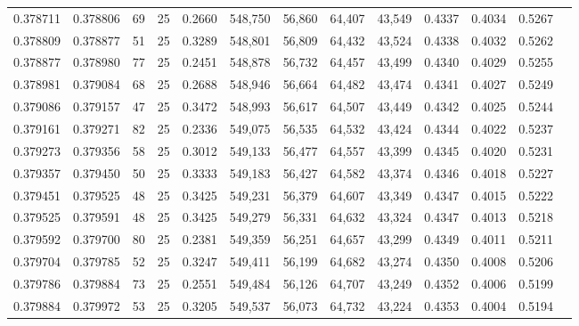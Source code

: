 \begin{tabular}{rrrrrrrrrrrrr}
0.378711 & 0.378806 &    69 &  25 &                                     0.2660 & 548,750 &  56,860 &  64,407 &  43,549 & 0.4337 & 0.4034 & 0.5267 \\
0.378809 & 0.378877 &    51 &  25 &                                     0.3289 & 548,801 &  56,809 &  64,432 &  43,524 & 0.4338 & 0.4032 & 0.5262 \\
0.378877 & 0.378980 &    77 &  25 &                                     0.2451 & 548,878 &  56,732 &  64,457 &  43,499 & 0.4340 & 0.4029 & 0.5255 \\
0.378981 & 0.379084 &    68 &  25 &                                     0.2688 & 548,946 &  56,664 &  64,482 &  43,474 & 0.4341 & 0.4027 & 0.5249 \\
0.379086 & 0.379157 &    47 &  25 &                                     0.3472 & 548,993 &  56,617 &  64,507 &  43,449 & 0.4342 & 0.4025 & 0.5244 \\
0.379161 & 0.379271 &    82 &  25 &                                     0.2336 & 549,075 &  56,535 &  64,532 &  43,424 & 0.4344 & 0.4022 & 0.5237 \\
0.379273 & 0.379356 &    58 &  25 &                                     0.3012 & 549,133 &  56,477 &  64,557 &  43,399 & 0.4345 & 0.4020 & 0.5231 \\
0.379357 & 0.379450 &    50 &  25 &                                     0.3333 & 549,183 &  56,427 &  64,582 &  43,374 & 0.4346 & 0.4018 & 0.5227 \\
0.379451 & 0.379525 &    48 &  25 &                                     0.3425 & 549,231 &  56,379 &  64,607 &  43,349 & 0.4347 & 0.4015 & 0.5222 \\
0.379525 & 0.379591 &    48 &  25 &                                     0.3425 & 549,279 &  56,331 &  64,632 &  43,324 & 0.4347 & 0.4013 & 0.5218 \\
0.379592 & 0.379700 &    80 &  25 &                                     0.2381 & 549,359 &  56,251 &  64,657 &  43,299 & 0.4349 & 0.4011 & 0.5211 \\
0.379704 & 0.379785 &    52 &  25 &                                     0.3247 & 549,411 &  56,199 &  64,682 &  43,274 & 0.4350 & 0.4008 & 0.5206 \\
0.379786 & 0.379884 &    73 &  25 &                                     0.2551 & 549,484 &  56,126 &  64,707 &  43,249 & 0.4352 & 0.4006 & 0.5199 \\
0.379884 & 0.379972 &    53 &  25 &                                     0.3205 & 549,537 &  56,073 &  64,732 &  43,224 & 0.4353 & 0.4004 & 0.5194 \\

\end{tabular}
